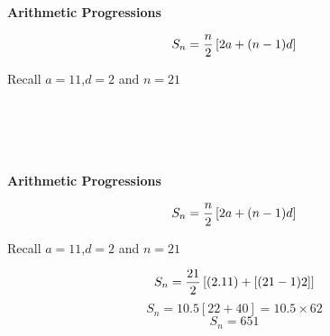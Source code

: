\documentclass{beamer}
\begin{document}


\noindent\textbf{Arithmetic Progressions}

\[ S_n  = {n \over 2} \left[ 2a+(n-1)d \right] \]

Recall $a=11$,$d=2$ and $n=21$


\[ \phantom{S_n  = {21 \over 2} \left[ (2.11) +[(21-1)2] \right]} \]
\[ \phantom{S_n  = 10.5 \left[ 22 + 40 \right]  = 10.5 \times 62}\]
\[ \phantom{S_n  = 651} \] 




\noindent\textbf{Arithmetic Progressions}

\[ S_n  = {n \over 2} \left[ 2a+(n-1)d \right] \]

Recall $a=11$,$d=2$ and $n=21$


\[ S_n  = {21 \over 2} \left[ (2.11) +[(21-1)2] \right] \]
\[ S_n  = 10.5 \left[ 22 + 40 \right]  = 10.5 \times 62\]
\[ S_n  = 651 \] 
\end{document}
